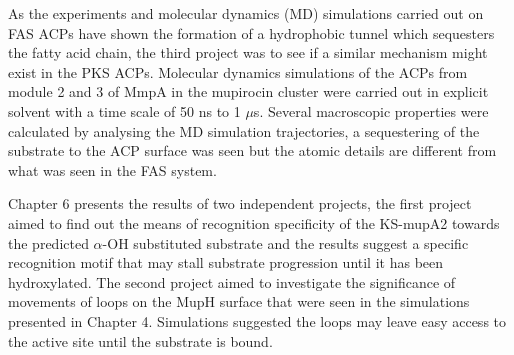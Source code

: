 	As the experiments and molecular dynamics (MD) simulations carried out on FAS ACPs \parencite{Chan2008} have shown the formation of a hydrophobic tunnel which sequesters the fatty acid chain, the third project was to see if a similar mechanism might exist in the PKS ACPs. Molecular dynamics simulations of the ACPs from module 2 and 3 of MmpA in the mupirocin cluster were carried out in explicit solvent with a time scale of 50 ns to 1 $ \mu $s. Several macroscopic properties were calculated by analysing the MD simulation trajectories, a sequestering of the substrate to the ACP surface was seen but the atomic details are different from what was seen in the FAS system. 
	
	Chapter 6 presents the results of two independent projects, the first project aimed to find out the means of recognition specificity of the KS-mupA2 towards the predicted $ \alpha $-OH substituted substrate and the results suggest a specific recognition motif that may stall substrate progression until it has been hydroxylated. The second project aimed to investigate the significance of movements of loops on the MupH surface that were seen in the simulations presented in Chapter 4. Simulations suggested the loops may leave easy access to the active site until the substrate is bound.
	

	

